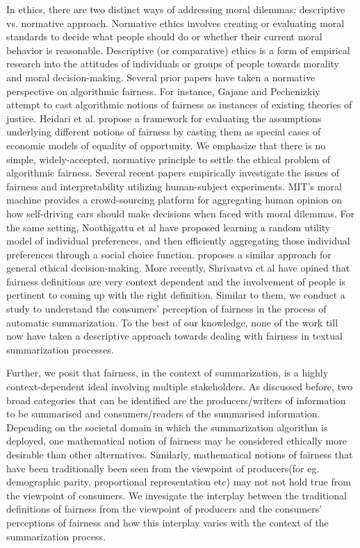 {In ethics, there are two distinct ways of addressing moral dilemmas: descriptive vs. normative approach. Normative ethics involves creating or evaluating moral standards to decide what people should do or whether their current moral behavior is reasonable. Descriptive (or comparative) ethics is a form of empirical research into the attitudes of individuals or groups of people towards morality and moral decision-making. Several prior papers have taken a normative perspective on algorithmic fairness. For instance, Gajane and Pechenizkiy\cite{gajane2017formalizing} attempt to cast algorithmic notions of fairness as instances of existing theories of justice. Heidari et al.\cite{heidari2019moral} propose a framework for evaluating the assumptions underlying different notions of fairness by casting them as special cases of economic models of equality of opportunity. We emphasize that there is no simple, widely-accepted, normative principle to settle the ethical problem of algorithmic fairness. 
Several recent papers empirically investigate the issues of fairness and interpretability utilizing human-subject experiments. MIT’s moral machine\cite{awad2018moral} provides a crowd-sourcing platform for aggregating human opinion on how self-driving cars should make decisions when faced with moral dilemmas. For the same setting, Noothigattu et al\cite{noothigattu2017voting} have proposed  learning a random utility model of individual preferences, and then efficiently aggregating those individual preferences through a social choice function. \cite{lee2019webuildai} proposes a similar approach for general ethical decision-making. More recently, Shrivastva et al\cite{srivastava2019mathematical} have opined that fairness definitions are very context dependent and the involvement of people is pertinent to coming up with the right definition. Similar to them, we conduct a study to understand the consumers’ perception of fairness in the process of automatic summarization. To the best of our knowledge, none of the work till now have taken a descriptive approach towards dealing with fairness in textual summarization processes.

Further, we posit that fairness, in the context of summarization, is a highly context-dependent ideal involving multiple stakeholders. As discussed before, two broad categories that can be identified are the producers/writers of information to be summarised and consumers/readers of the summarised information. Depending on the societal domain in which the summarization
algorithm is deployed, one mathematical notion of fairness may be considered ethically more desirable than other alternatives. Similarly, mathematical notions of fairness that have been traditionally been seen from the viewpoint of producers(for eg. demographic parity, proportional representation etc) may not not hold true from the viewpoint of consumers. We invesigate the interplay between the traditional definitions of fairness from the viewpoint of producers and the consumers' perceptions of fairness and how this interplay varies with the context of the summarization process.

}
\fi 